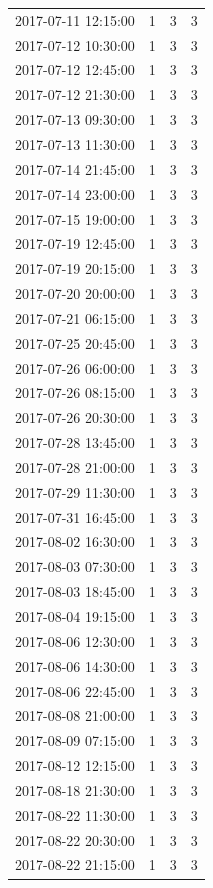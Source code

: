 \begin{tabular}{lrrr}
2017-07-11 12:15:00 & 1 & 3 & 3 \\
2017-07-12 10:30:00 & 1 & 3 & 3 \\
2017-07-12 12:45:00 & 1 & 3 & 3 \\
2017-07-12 21:30:00 & 1 & 3 & 3 \\
2017-07-13 09:30:00 & 1 & 3 & 3 \\
2017-07-13 11:30:00 & 1 & 3 & 3 \\
2017-07-14 21:45:00 & 1 & 3 & 3 \\
2017-07-14 23:00:00 & 1 & 3 & 3 \\
2017-07-15 19:00:00 & 1 & 3 & 3 \\
2017-07-19 12:45:00 & 1 & 3 & 3 \\
2017-07-19 20:15:00 & 1 & 3 & 3 \\
2017-07-20 20:00:00 & 1 & 3 & 3 \\
2017-07-21 06:15:00 & 1 & 3 & 3 \\
2017-07-25 20:45:00 & 1 & 3 & 3 \\
2017-07-26 06:00:00 & 1 & 3 & 3 \\
2017-07-26 08:15:00 & 1 & 3 & 3 \\
2017-07-26 20:30:00 & 1 & 3 & 3 \\
2017-07-28 13:45:00 & 1 & 3 & 3 \\
2017-07-28 21:00:00 & 1 & 3 & 3 \\
2017-07-29 11:30:00 & 1 & 3 & 3 \\
2017-07-31 16:45:00 & 1 & 3 & 3 \\
2017-08-02 16:30:00 & 1 & 3 & 3 \\
2017-08-03 07:30:00 & 1 & 3 & 3 \\
2017-08-03 18:45:00 & 1 & 3 & 3 \\
2017-08-04 19:15:00 & 1 & 3 & 3 \\
2017-08-06 12:30:00 & 1 & 3 & 3 \\
2017-08-06 14:30:00 & 1 & 3 & 3 \\
2017-08-06 22:45:00 & 1 & 3 & 3 \\
2017-08-08 21:00:00 & 1 & 3 & 3 \\
2017-08-09 07:15:00 & 1 & 3 & 3 \\
2017-08-12 12:15:00 & 1 & 3 & 3 \\
2017-08-18 21:30:00 & 1 & 3 & 3 \\
2017-08-22 11:30:00 & 1 & 3 & 3 \\
2017-08-22 20:30:00 & 1 & 3 & 3 \\
2017-08-22 21:15:00 & 1 & 3 & 3 \\

\end{tabular}
